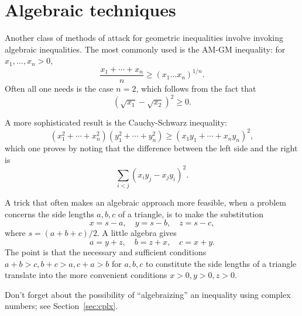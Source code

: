 \documentclass[12pt]{book}
\numberwithin{exc}{section}
\numberwithin{figure}{section}
\numberwithin{equation}{theorem}
\begin{document}
\section{Algebraic techniques}
Another class of methods of attack for geometric inequalities involve 
invoking algebraic inequalities. The most commonly used is the
AM-GM inequality: for $x_{1}, \dots, x_{n} > 0$,
\[
\frac{x_{1} + \cdots + x_{n}}{n} \geq (x_{1}\dots x_{n})^{1/n}.
\]
Often all one needs is the case $n=2$, which follows from the fact 
that
\[
(\sqrt{x_{1}} - \sqrt{x_{2}})^{2} \geq 0.
\]

A more sophisticated result is the Cauchy-Schwarz inequality:
\[
(x_{1}^{2} + \cdots + x_{n}^{2})(y_{1}^{2} + \cdots + y_{n}^{2})
\geq (x_{1}y_{1} + \cdots + x_{n}y_{n})^{2},
\]
which one proves by noting that the difference between the left side 
and the right is
\[
\sum_{i<j} (x_{i}y_{j} - x_{j}y_{i})^{2}.
\]

A trick that often makes an algebraic approach more feasible, when a 
problem concerns the side lengths $a,b,c$ of a triangle, is to
make the substitution
\[
x = s-a, \quad y = s-b, \quad z = s - c,
\]
where $s = (a+b+c)/2$. A little algebra gives
\[
a = y+z, \quad b = z+x, \quad c = x+y.
\]
The point is that the necessary and sufficient
conditions $a+b > c, b+c > a, c+a > b$ for $a,b,c$ to constitute the 
side lengths of a triangle translate into the more convenient 
conditions $x>0, y>0, z>0$.

Don't forget about the possibility of ``algebraizing'' an inequality 
using complex numbers; see Section~\ref{sec:cplx}.
\end{document}
